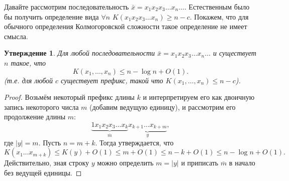 \documentclass[12pt]{article}
\theoremstyle{definition}
\theoremstyle{plain}
\newtheorem{statement}{Утверждение}[section]
\theoremstyle{remark}
\begin{document}
Давайте рассмотрим последовательность $\bar x = x_1x_2x_3\dotso x_n\dotso$.
Естественным было бы получить определение вида $\forall n$ $K(x_1x_2x_3\dotso x_n)\ge n - c$. 
Покажем, что для обычного определения Колмогоровской сложности такое определение не имеет смысла.

\begin{statement}
Для любой последовательности $\bar x = x_1x_2x_3\dotso x_n\dotso$
и существует $n$ такое, что 
\[
    K(x_1,\dotsc,x_n) \le n - \log n + O(1).
\]
(т.е. для любой $c$ существует префикс, такой что $K(x_1,\dotsc,x_n) \le n - c$). 
\end{statement}
\begin{proof}
    Возьмём некоторый префикс длины $k$ и интерпретируем его как двоичную запись
    некоторого числа $m$ (добавим ведущую единицу), и рассмотрим его
    продолжение длины $m$: 
    \[
    \underbrace{1x_1x_2x_3\dotso x_k}_{\overline m}
    \underbrace{x_{k+1}\dotso x_{k + m}}_{y},
    \]
    где $|y| = m$. Пусть $n = m + k$. Тогда утверждается, что
    \[
        K(x_1\dotso x_{m+k}) \le K(y) + O(1) \le m + O(1) \le n - k + O(1) \le n - \log n + O(1).
    \]
    Действительно, зная строку $y$ можно определить $m = |y|$ и приписать
    $\overline m$ в начало без ведущей единицы.
\end{proof}
\end{document}
